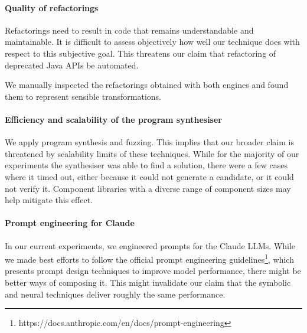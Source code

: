 \documentclass[conference]{IEEEtran}
\begin{document}
\paragraph{Quality of refactorings} Refactorings need to result in code that
remains understandable and maintainable.  It is difficult to assess
objectively how well our technique does with respect to this subjective
goal.  This threatens our claim that refactoring of deprecated Java APIs
be automated.

%
We manually inspected the refactorings obtained with
both engines and found them to represent sensible transformations.

\paragraph{Efficiency and scalability of the program synthesiser}
%
We apply program synthesis and fuzzing.  This implies that our broader claim
is threatened by scalability limits of these techniques.  While for the
majority of our experiments the synthesiser was able to find a solution,
there were a few cases where it timed out, either because it could not
generate a candidate, or it could not verify it.  Component libraries with a
diverse range of component sizes may help mitigate this effect.

\paragraph{Prompt engineering for Claude}
%
In our current experiments, we engineered prompts for the Claude LLMs. 
While we made best efforts to follow the official prompt engineering
guidelines\footnote{https://docs.anthropic.com/en/docs/prompt-engineering},
which presents prompt design techniques to improve model performance, there
might be better ways of composing it.  This might invalidate our claim that
the symbolic and neural techniques deliver roughly the same performance.

%
\end{document}
